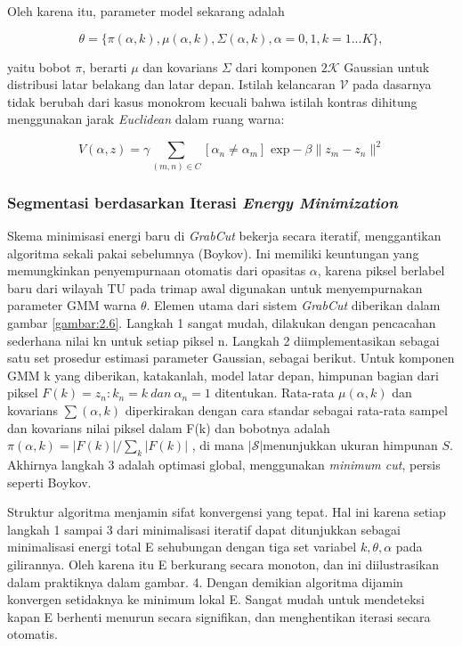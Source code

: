 Oleh karena itu, parameter model sekarang adalah 

\begin{equation} \label{eq:rumus_energi3}
  \theta = \{ \pi(\alpha, k), \mu (\alpha, k), \Sigma (\alpha, k), \alpha = 0,1, k = 1...K \},
\end{equation}  

yaitu bobot \(\pi\), berarti \(\mu\) dan kovarians \(\Sigma\) dari komponen \(\mathcal{2K} \)
Gaussian untuk distribusi latar belakang dan latar depan. Istilah kelancaran \(\mathcal{V}\) 
pada dasarnya tidak berubah dari kasus monokrom kecuali bahwa istilah kontras dihitung 
menggunakan jarak \emph{Euclidean} dalam ruang warna: 

\begin{equation} \label{eq:rumus_energi4}
  V(\alpha, z) = \gamma \sum_{(m,n)\in C} [\alpha_{n} \neq \alpha_{m}] \textrm{ exp} - \beta \|z_{m} - z_{n}\|^2
\end{equation}


\subsubsection{{Segmentasi berdasarkan Iterasi \emph{Energy Minimization}}}


Skema minimisasi energi baru di \emph{GrabCut} bekerja secara iteratif, menggantikan algoritma 
sekali pakai sebelumnya (Boykov). Ini memiliki keuntungan yang memungkinkan 
penyempurnaan otomatis dari opasitas \(\alpha\), karena piksel berlabel baru dari 
wilayah TU pada trimap awal digunakan untuk menyempurnakan parameter GMM warna \( \theta \). 
Elemen utama dari sistem \emph{GrabCut} diberikan dalam gambar \ref{gambar:2.6}. Langkah 1 sangat mudah, 
dilakukan dengan pencacahan sederhana nilai kn untuk setiap piksel n. Langkah 2 
diimplementasikan sebagai satu set prosedur estimasi parameter Gaussian, sebagai 
berikut. Untuk komponen GMM k yang diberikan, katakanlah, model latar depan, himpunan 
bagian dari piksel \(F(k) = {z_{n} : k_{n} = k \: dan \: \alpha_{n} = 1}\) ditentukan. 
Rata-rata \(\mu(\alpha, k)\) dan kovarians \(\sum(\alpha, k)\) diperkirakan dengan 
cara standar sebagai rata-rata sampel dan kovarians nilai piksel dalam F(k) dan 
bobotnya adalah \(\pi(\alpha, k)= |F( k)|/\sum_{k} |F(k)|\) , di mana \(\mathcal{|S|} \)menunjukkan 
ukuran himpunan \(S\). Akhirnya langkah 3 adalah optimasi global, menggunakan \emph{minimum cut}, 
persis seperti Boykov.


Struktur algoritma menjamin sifat konvergensi yang tepat. Hal ini karena setiap 
langkah 1 sampai 3 dari minimalisasi iteratif dapat ditunjukkan sebagai minimalisasi 
energi total E sehubungan dengan tiga set variabel \(k, \theta, \alpha\) pada gilirannya. Oleh 
karena itu E berkurang secara monoton, dan ini diilustrasikan dalam praktiknya 
dalam gambar. 4. Dengan demikian algoritma dijamin konvergen setidaknya ke minimum 
lokal E. Sangat mudah untuk mendeteksi kapan E berhenti menurun secara signifikan, 
dan menghentikan iterasi secara otomatis. 



